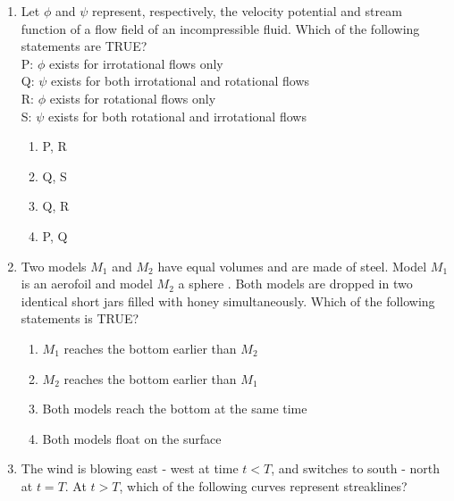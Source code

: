\documentclass[a4paper,10pt]{article}
\begin{document}
\begin{enumerate}
\item Let $\phi$ and $\psi$ represent, respectively, the velocity potential and stream function of a flow field of an incompressible fluid. Which of the following statements are TRUE? \\
P: $\phi$ exists for irrotational flows only \\
Q: $\psi$ exists for both irrotational and rotational flows \\
R: $\phi$ exists for rotational flows only \\
S: $\psi$ exists for both rotational and irrotational flows
\hfill{}

\begin{multicols}{4}
\begin{enumerate}
\item P, R
\item Q, S
\item Q, R
\item P, Q
\end{enumerate}
\end{multicols}

\item Two models $M_1$ and $M_2$ have equal volumes and are made of steel. Model $M_1$ is an aerofoil  and model $M_2$ a sphere . Both models are dropped in two identical short jars filled with honey simultaneously. Which of the following statements is TRUE?
\hfill{}

\begin{enumerate}
\item $M_1$ reaches the bottom earlier than $M_2$
\item $M_2$ reaches the bottom earlier than $M_1$
\item Both models reach the bottom at the same time
\item Both models float on the surface
\end{enumerate}

\item The wind is blowing east - west at time $t < T$, and switches to south - north at $t = T$. At $t > T$, which of the following curves represent streaklines?
\hfill{}


\end{enumerate}
\end{document}
